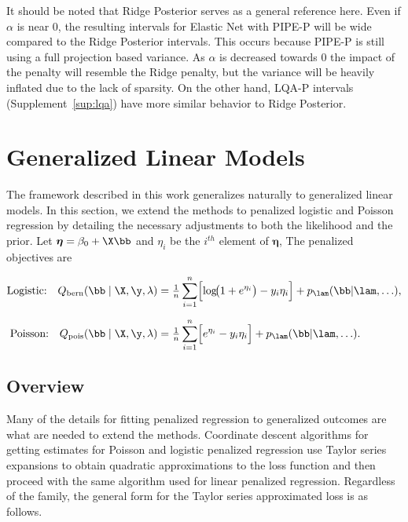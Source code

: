 It should be noted that Ridge Posterior serves as a general reference here. Even if $\alpha$ is near 0, the resulting intervals for Elastic Net with PIPE-P will be wide compared to the Ridge Posterior intervals. This occurs because PIPE-P is still using a full projection based variance. As $\alpha$ is decreased towards $0$ the impact of the penalty will resemble the Ridge penalty, but the variance will be heavily inflated due to the lack of sparsity. On the other hand, LQA-P intervals (Supplement~\ref{sup:lqa}) have more similar behavior to Ridge Posterior.

\section{Generalized Linear Models}
\label{sec:alt-fam}

The framework described in this work generalizes naturally to generalized linear models. In this section, we extend the methods to penalized logistic and Poisson regression by detailing the necessary adjustments to both the likelihood and the prior. Let $\boldsymbol{\eta} = \beta_0 + \X \bb$ and $\eta_i$ be the $i^{th}$ element of $\boldsymbol{\eta}$, The penalized objectives are

$$
\begin{aligned}
\text{Logistic:}\quad
Q_{\text{bern}}(\bb\mid\X,\y,\lambda)
  &= \tfrac{1}{n}\sum_{i=1}^{n}
     \Bigl[
       \log\!\bigl(1+e^{\eta_i}\bigr)
       - y_i\eta_i
     \Bigr]
     + p_\lam(\bb|\lam, \ldots), \\[6pt]
\text{Poisson:}\quad
Q_{\text{pois}}(\bb\mid\X,\y,\lambda)
  &= \tfrac{1}{n}\sum_{i=1}^{n}
     \Bigl[
       e^{\eta_i}
       - y_i\eta_i
     \Bigr]
     + p_\lam(\bb|\lam, \ldots).
\end{aligned}
$$

\subsection{Overview}

Many of the details for fitting penalized regression to generalized outcomes are what are needed to extend the methods. Coordinate descent algorithms for getting estimates for Poisson and logistic penalized regression use Taylor series expansions to obtain quadratic approximations to the loss function and then proceed with the same algorithm used for linear penalized regression. Regardless of the family, the general form for the Taylor series approximated loss is as follows.

